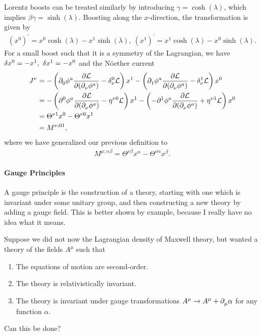Lorentz boosts can be treated similarly by introducing $\gamma = \cosh(\lambda)$, which implies $\beta\gamma = \sinh(\lambda)$. Boosting along the $x$-direction, the transformation is given by
\begin{align*}
	(x^{0})^{\prime} = x^{0}\cosh(\lambda) - x^{1}\sinh(\lambda),\ (x^{1})^{\prime} = x^{1}\cosh(\lambda) - x^{0}\sinh(\lambda).
\end{align*}
For a small boost such that it is a symmetry of the Lagrangian, we have $\var{x^{0}} = - x^{1},\ \var{x^{1}} = -x^{0}$ and the Nöether current
\begin{align*}
	J^{\nu} &= -\left(\del{}{0}{\phi^{a}}\pdv{\lag}{(\del{}{\nu}{\phi^{a}})} - \kdelta{0}{\nu}\lag\right)x^{1} - \left(\del{}{1}{\phi^{a}}\pdv{\lag}{(\del{}{\nu}{\phi^{a}})} - \kdelta{1}{\nu}\lag\right)x^{0} \\
	        &= -\left(\del{0}{}{\phi^{a}}\pdv{\lag}{(\del{}{\nu}{\phi^{a}})} - \eta^{\nu 0}\lag\right)x^{1} - \left(-\del{1}{}{\phi^{a}}\pdv{\lag}{(\del{}{\nu}{\phi^{a}})} + \eta^{\nu 1}\lag\right)x^{0} \\
	        &= \Theta^{\nu 1}x^{0} - \Theta^{\nu 0}x^{1} \\
	        &= M^{\nu;01},
\end{align*}
where we have generalized our previous definition to
\begin{align*}
	M^{\mu;\alpha\beta} = \Theta^{\nu\beta}x^{\alpha} - \Theta^{\nu\alpha}x^{\beta}.
\end{align*}

\paragraph{Gauge Principles}
A gauge principle is the construction of a theory, starting with one which is invariant under some unitary group, and then constructing a new theory by adding a gauge field. This is better shown by example, because I really have no idea what it means.

Suppose we did not now the Lagrangian density of Maxwell theory, but wanted a theory of the fields $A^{\mu}$ such that
\begin{enumerate}
	\item The equations of motion are second-order.
	\item The theory is relativistically invariant.
	\item The theory is invariant under gauge transformations $A^{\mu}\to A^{\mu} + \partial^{}_{\mu}{\alpha}$ for any function $\alpha$.
\end{enumerate}
Can this be done?

